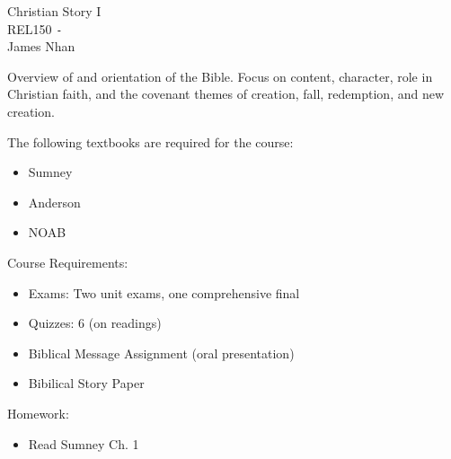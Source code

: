 \documentclass{article}
\begin{document}
\begin{titlepage}
\begin{center}
    {\large Christian Story I} \\
    REL150 \texttt{-} \longdate{\today} \\
    James Nhan
\end{center}
\end{titlepage}

Overview of and orientation of the Bible. Focus on content, character, role in Christian faith, and the covenant themes of creation, fall, redemption, and new creation.
\vspace{10pt}

\noindent The following textbooks are required for the course:

\begin{itemize}
    \item Sumney
    \item Anderson
    \item NOAB
\end{itemize}

\noindent Course Requirements:

\begin{itemize}
    \item Exams: Two unit exams, one comprehensive final
    \item Quizzes: 6 (on readings)
    \item Biblical Message Assignment (oral presentation)
    \item Bibilical Story Paper
\end{itemize}

\noindent Homework:

\begin{itemize}
    \item Read Sumney Ch. 1
\end{itemize}
\end{document}
